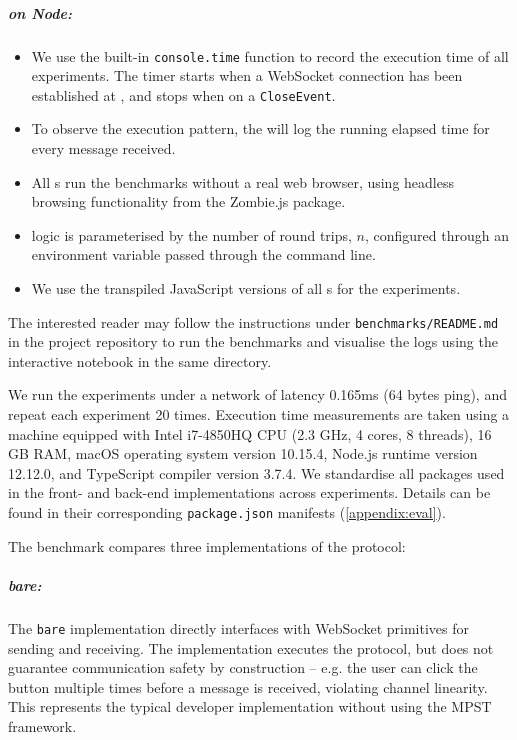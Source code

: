 \subparagraph{  on Node:}
\begin{itemize}

\item We use the built-in \texttt{console.time} function to record
the execution time of all experiments. 
The timer starts when a WebSocket connection has been established at
, and stops when on a \texttt{CloseEvent}.

\item To observe the execution pattern, the  will log the running 
elapsed time for every  message received.

\item All s run the benchmarks without a real web browser,
using headless browsing functionality from 
the Zombie.js \cite{zombie} package.

\item {} logic is parameterised by the number of round trips,
$n$, configured through an environment variable passed through 
the command line.

\item We use the transpiled JavaScript versions of all s
for the experiments.

\end{itemize}

The interested reader may follow the instructions under
\texttt{benchmarks/README.md} in the project repository \cite{repo}
to run the benchmarks and visualise the logs using the interactive
notebook in the same directory.

We run the experiments under a network of latency 0.165ms
(64 bytes ping), and repeat each experiment 20 times.
Execution time measurements  are taken using a machine 
equipped with Intel i7-4850HQ CPU (2.3 GHz, 4 cores, 8 threads), 
16 GB RAM, macOS operating system version 10.15.4, 
Node.js runtime version 12.12.0, and
TypeScript compiler version 3.7.4.
We standardise all packages used in the front- and back-end
implementations across experiments. Details can be found in their
corresponding \texttt{package.json} manifests (\cref{appendix:eval}).

The benchmark compares three implementations of the  protocol:

\subparagraph{bare:}
The \texttt{bare} implementation directly interfaces with 
WebSocket primitives for sending and receiving. 
The implementation executes the  protocol, but does not 
guarantee communication safety by construction -- e.g. the user can click
the  button multiple times before a  message 
is received, violating channel linearity. 
This represents the typical developer implementation without using the
MPST framework.

